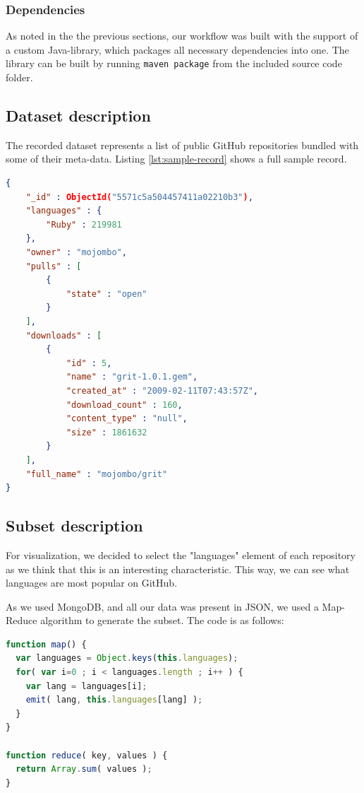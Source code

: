 \subsubsection{Dependencies}\label{sec:dependencies}

As noted in the the previous sections, our workflow was built with the support
of a custom Java-library, which packages all necessary dependencies into one.
The library can be built by running \texttt{maven package} from the included
source code folder.

\subsection{Dataset description}

The recorded dataset represents a list of public GitHub repositories bundled
with some of their meta-data. Listing \ref{lst:sample-record} shows a full
sample record.

\begin{lstlisting}[language=json,label=lst:sample-record]
{
    "_id" : ObjectId("5571c5a504457411a02210b3"),
    "languages" : {
        "Ruby" : 219981
    },
    "owner" : "mojombo",
    "pulls" : [
        {
            "state" : "open"
        }
    ],
    "downloads" : [
        {
            "id" : 5,
            "name" : "grit-1.0.1.gem",
            "created_at" : "2009-02-11T07:43:57Z",
            "download_count" : 160,
            "content_type" : "null",
            "size" : 1861632
        }
    ],
    "full_name" : "mojombo/grit"
}
\end{lstlisting}

\subsection{Subset description}\label{sec:subset-description}

For visualization, we decided to select the "languages" element of each
repository as we think that this is an interesting characteristic. This way, we
can see what languages are most popular on GitHub.

As we used MongoDB, and all our data was present in JSON, we used a Map-Reduce
algorithm to generate the subset. The code is as follows:

\begin{lstlisting}[language=javascript]
function map() {
  var languages = Object.keys(this.languages);
  for( var i=0 ; i < languages.length ; i++ ) {
    var lang = languages[i];
    emit( lang, this.languages[lang] );
  }
}

function reduce( key, values ) {
  return Array.sum( values );
}
\end{lstlisting}

